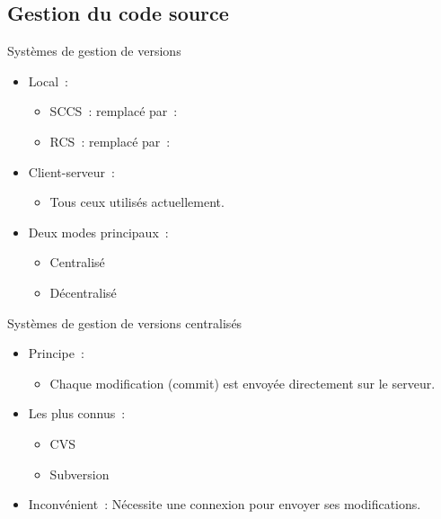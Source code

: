 \subsection{Gestion du code source}

\begin{frame}{Systèmes de gestion de versions}
\begin{itemize}[<+->]
 \item Local~:
 \begin{itemize}[<+->]
  \item SCCS~: remplacé par~:
  \item RCS~: remplacé par~:
 \end{itemize}
 \item Client-serveur~:
 \begin{itemize}[<+->]
  \item Tous ceux utilisés actuellement.
 \end{itemize}
 \item Deux modes principaux~:
 \begin{itemize}
 \item Centralisé
 \item Décentralisé
 \end{itemize}
\end{itemize}
\end{frame}

\begin{frame}{Systèmes de gestion de versions centralisés}
\begin{itemize}[<+->]
 \item Principe~:
 \begin{itemize}
  \item Chaque modification (commit) est envoyée directement sur le serveur.
 \end{itemize}
 \item Les plus connus~:
 \begin{itemize}[<+->]
  \item CVS
  \item Subversion
 \end{itemize}
 \item Inconvénient~: Nécessite une connexion pour envoyer ses modifications.
\end{itemize}
\end{frame}

